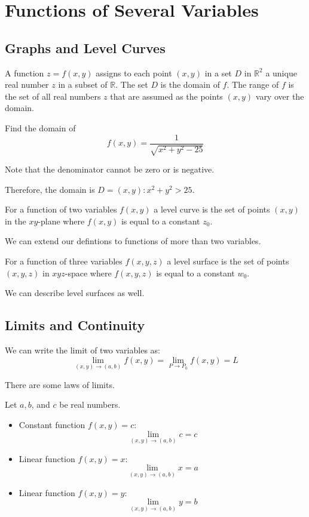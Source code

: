 \documentclass[../calc3.tex]{subfiles}
\begin{document}
\chapter{Functions of Several Variables}
\section{Graphs and Level Curves}
\begin{definition}
A function $z=f(x,y)$ assigns to each point $(x,y)$ in a set $D$ in $\mathbb{R}^2$ a unique
real number $z$ in a subset of $\mathbb{R}$. The set $D$ is the domain of $f$. The range of $f$
is the set of all real numbers $z$ that are assumed as the points $(x,y)$ vary over the domain.    
\end{definition}

\begin{example}
    Find the domain of 
    \[f(x,y)=\frac{1}{\sqrt{x^2+y^2-25}}\]

    Note that the denominator cannot be zero or is negative. 

    Therefore, the domain is $D = {(x,y): x^2+y^2>25}$. 
\end{example}

\begin{definition}
    For a function of two variables $f(x,y)$ a level curve is the set of points
    $(x,y)$ in the $xy$-plane where $f(x,y)$ is equal to a constant $z_0$.
\end{definition}

We can extend our defintions to functions of more than two variables.

\begin{definition}
    For a function of three variables $f(x,y,z)$ a level surface is the set of points
    $(x,y,z)$ in $xyz$-space where $f(x,y,z)$ is equal to a constant $w_0$.
\end{definition}

We can describe level surfaces as well.

\section{Limits and Continuity}
We can write the limit of two variables as:
\[ \lim_{{(x,y)}\to{(a,b)}}f(x,y)=\lim_{P\to P_0}f(x,y)=L\]

There are some laws of limits.
\begin{theorem}
    Let $a,b$, and $c$ be real numbers.

    \begin{itemize}
        \item Constant function $f(x,y) = c$:
        \[\lim_{(x,y)\to(a,b)}c=c\]
        \item Linear function $f(x,y) = x$:
        \[\lim_{(x,y)\to(a,b)}x=a\]
        \item Linear function $f(x,y) = y$:
        \[\lim_{(x,y)\to(a,b)}y=b\]
    \end{itemize}
\end{theorem}
\end{document}
